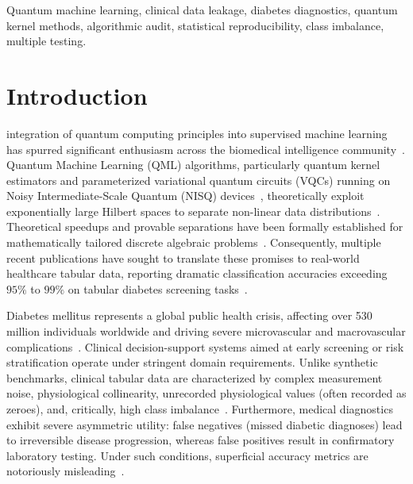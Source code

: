 \documentclass[journal,twocolumn]{IEEEtran}
\begin{document}
\begin{IEEEkeywords}
Quantum machine learning, clinical data leakage, diabetes diagnostics, quantum kernel methods, algorithmic audit, statistical reproducibility, class imbalance, multiple testing.
\end{IEEEkeywords}

\IEEEpeerreviewmaketitle

\section{Introduction}
 integration of quantum computing principles into supervised machine learning has spurred significant enthusiasm across the biomedical intelligence community~\cite{biamonte2017quantum,cerezo2021variational}. Quantum Machine Learning (QML) algorithms, particularly quantum kernel estimators and parameterized variational quantum circuits (VQCs) running on Noisy Intermediate-Scale Quantum (NISQ) devices~\cite{preskill2018quantum}, theoretically exploit exponentially large Hilbert spaces to separate non-linear data distributions~\cite{havlicek2019supervised,schuld2019quantum}. Theoretical speedups and provable separations have been formally established for mathematically tailored discrete algebraic problems~\cite{liu2021rigorous}. Consequently, multiple recent publications have sought to translate these promises to real-world healthcare tabular data, reporting dramatic classification accuracies exceeding $95\%$ to $99\%$ on tabular diabetes screening tasks~\cite{daga2026adaptive,upama2026,young2025,kotha2026,kiran2025,sodar2026,yadav2026,zhang2025}.

Diabetes mellitus represents a global public health crisis, affecting over 530 million individuals worldwide and driving severe microvascular and macrovascular complications~\cite{sun2022idf}. Clinical decision-support systems aimed at early screening or risk stratification operate under stringent domain requirements. Unlike synthetic benchmarks, clinical tabular data are characterized by complex measurement noise, physiological collinearity, unrecorded physiological values (often recorded as zeroes), and, critically, high class imbalance~\cite{fernandez2018learning}. Furthermore, medical diagnostics exhibit severe asymmetric utility: false negatives (missed diabetic diagnoses) lead to irreversible disease progression, whereas false positives result in confirmatory laboratory testing. Under such conditions, superficial accuracy metrics are notoriously misleading~\cite{chicco2020advantages}.
\end{document}
